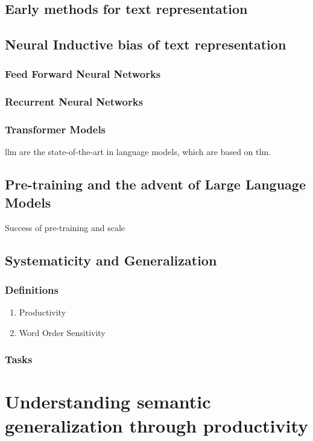 \documentclass[letterpaper, 12pt]{report}
\begin{document}
\section{Early methods for text representation}
\label{sec:org7176877}
\section{Neural Inductive bias of text representation}
\label{sec:org2479903}
\subsection{Feed Forward Neural Networks}
\label{sec:orgc5c64b1}
\subsection{Recurrent Neural Networks}
\label{sec:org081fc19}
\subsection{Transformer Models}
\label{sec:orgce0ee81}

\gls{llm} are the state-of-the-art in language models, which are based on \gls{tlm}.
\section{Pre-training and the advent of Large Language Models}
\label{sec:org754bcf3}
Success of pre-training and scale
\section{Systematicity and Generalization}
\label{sec:orgb799e4e}
\subsection{Definitions}
\label{sec:org70d8bf6}
\begin{enumerate}
\item Productivity
\label{sec:orgbb21691}
\item Word Order Sensitivity
\label{sec:org41a33eb}
\end{enumerate}
\subsection{Tasks}
\label{sec:org51f5f2f}
\clearpage
\chapter{Understanding semantic generalization through productivity}
\label{sec:org63ce972}
\end{document}
